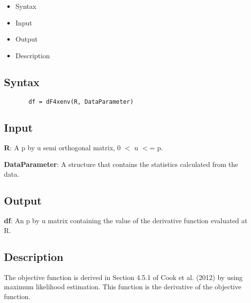 \documentclass[a4paper,11pt,openany]{memoir}
\begin{document}
\begin{itemize}
\setlength{\itemsep}{-1ex}
   \item Syntax
   \item Input
   \item Output
   \item Description
\end{itemize}


\subsection*{Syntax}


\begin{verbatim}       df = dF4xenv(R, DataParameter)\end{verbatim}
    

\subsection*{Input}

\begin{par}
\textbf{R}: A p by u semi orthogonal matrix, 0 \ensuremath{<} u \ensuremath{<}= p.
\end{par} \vspace{1em}
\begin{par}
\textbf{DataParameter}: A structure that contains the statistics calculated from the data.
\end{par} \vspace{1em}


\subsection*{Output}

\begin{par}
\textbf{df}: An p by u matrix containing the value of the derivative function evaluated at R.
\end{par} \vspace{1em}


\subsection*{Description}

\begin{par}
The objective function is derived in Section 4.5.1 of Cook et al. (2012) by  using maximum likelihood estimation. This function is the derivative of  the objective function.
\end{par} \vspace{1em}
\end{document}
